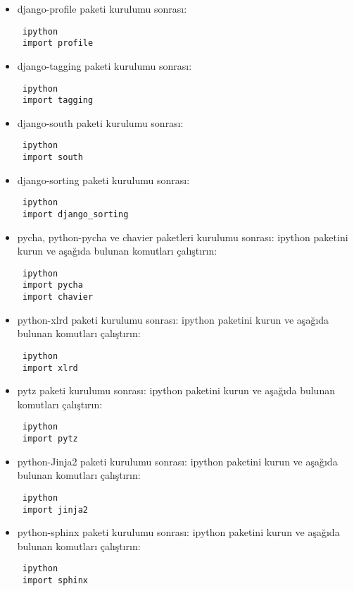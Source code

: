 \documentclass[a4paper,10pt]{article}
\begin{document}
\begin{itemize}
\item django-profile paketi kurulumu sonrası:

\begin{verbatim}
 ipython
 import profile
\end{verbatim}

\item django-tagging paketi kurulumu sonrası:
\begin{verbatim}
 ipython
 import tagging
\end{verbatim}

\item django-south paketi kurulumu sonrası:
\begin{verbatim}
 ipython
 import south
\end{verbatim}

\item django-sorting paketi kurulumu sonrası:

\begin{verbatim}
 ipython
 import django_sorting
\end{verbatim}

\item pycha, python-pycha ve chavier paketleri kurulumu sonrası:
ipython paketini kurun ve aşağıda bulunan komutları çalıştırın:
\begin{verbatim}
 ipython
 import pycha
 import chavier
\end{verbatim}

\item python-xlrd paketi kurulumu sonrası:
ipython paketini kurun ve aşağıda bulunan komutları çalıştırın:
\begin{verbatim}
 ipython
 import xlrd
\end{verbatim}

\item pytz paketi kurulumu sonrası:
ipython paketini kurun ve aşağıda bulunan komutları çalıştırın:
\begin{verbatim}
 ipython
 import pytz
\end{verbatim}

\item python-Jinja2 paketi kurulumu sonrası:
ipython paketini kurun ve aşağıda bulunan komutları çalıştırın:
\begin{verbatim}
 ipython
 import jinja2
\end{verbatim}

\item python-sphinx paketi kurulumu sonrası:
ipython paketini kurun ve aşağıda bulunan komutları çalıştırın:
\begin{verbatim}
 ipython
 import sphinx
\end{verbatim}



\end{itemize}
\end{document}
